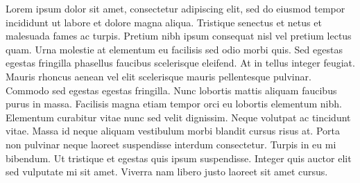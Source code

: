 
Lorem ipsum dolor sit amet, consectetur adipiscing elit, sed do eiusmod tempor
incididunt ut labore et dolore magna aliqua. Tristique senectus et netus et
malesuada fames ac turpis. Pretium nibh ipsum consequat nisl vel pretium lectus
quam. Urna molestie at elementum eu facilisis sed odio morbi quis. Sed egestas
egestas fringilla phasellus faucibus scelerisque eleifend. At in tellus integer
feugiat. Mauris rhoncus aenean vel elit scelerisque mauris pellentesque
pulvinar. Commodo sed egestas egestas fringilla. Nunc lobortis mattis aliquam
faucibus purus in massa. Facilisis magna etiam tempor orci eu lobortis elementum
nibh. Elementum curabitur vitae nunc sed velit dignissim. Neque volutpat ac
tincidunt vitae. Massa id neque aliquam vestibulum morbi blandit cursus risus
at. Porta non pulvinar neque laoreet suspendisse interdum consectetur. Turpis
in eu mi bibendum. Ut tristique et egestas quis ipsum suspendisse. Integer quis
auctor elit sed vulputate mi sit amet. Viverra nam libero justo laoreet sit amet
cursus.

\vspace*{5\baselineskip}
